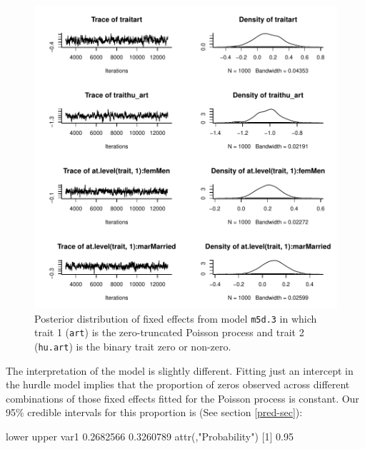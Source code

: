 \documentclass{article}
\begin{document}
\begin{figure}[!h]
\begin{center}
\includegraphics{Lecture5-046}
\end{center}
\caption{Posterior distribution of fixed effects from model \texttt{m5d.3} in which trait 1 (\texttt{art}) is the zero-truncated Poisson process and trait 2 (\texttt{hu.art}) is the binary trait zero or non-zero.}
\label{HU}
\end{figure}

The interpretation of the model is slightly different. Fitting just an intercept in the hurdle model implies that the proportion of zeros observed across different combinations of those fixed effects fitted for the Poisson process is constant. Our 95\% credible intervals for this proportion is (See section \ref{pred-sec}):

\begin{Schunk}
\begin{Soutput}
         lower     upper
var1 0.2682566 0.3260789
attr(,"Probability")
[1] 0.95
\end{Soutput}
\end{Schunk}
\end{document}
